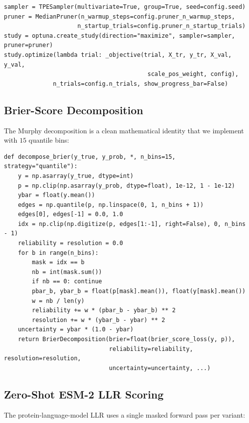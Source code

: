 \documentclass[11pt,a4paper,oneside]{report}
\begin{document}
\begin{lstlisting}[caption={Optuna TPE search definition.},label={lst:tpe}]
sampler = TPESampler(multivariate=True, group=True, seed=config.seed)
pruner = MedianPruner(n_warmup_steps=config.pruner_n_warmup_steps,
                     n_startup_trials=config.pruner_n_startup_trials)
study = optuna.create_study(direction="maximize", sampler=sampler, pruner=pruner)
study.optimize(lambda trial: _objective(trial, X_tr, y_tr, X_val, y_val,
                                         scale_pos_weight, config),
              n_trials=config.n_trials, show_progress_bar=False)
\end{lstlisting}

\subsection{Brier-Score Decomposition}
\label{sec:impl-brier}
The Murphy decomposition is a clean mathematical
identity that we implement with $15$ quantile bins:

\begin{lstlisting}[caption={Brier decomposition from \texttt{src/calibration\_deep.py}.},label={lst:brier}]
def decompose_brier(y_true, y_prob, *, n_bins=15, strategy="quantile"):
    y = np.asarray(y_true, dtype=int)
    p = np.clip(np.asarray(y_prob, dtype=float), 1e-12, 1 - 1e-12)
    ybar = float(y.mean())
    edges = np.quantile(p, np.linspace(0, 1, n_bins + 1))
    edges[0], edges[-1] = 0.0, 1.0
    idx = np.clip(np.digitize(p, edges[1:-1], right=False), 0, n_bins - 1)
    reliability = resolution = 0.0
    for b in range(n_bins):
        mask = idx == b
        nb = int(mask.sum())
        if nb == 0: continue
        pbar_b, ybar_b = float(p[mask].mean()), float(y[mask].mean())
        w = nb / len(y)
        reliability += w * (pbar_b - ybar_b) ** 2
        resolution += w * (ybar_b - ybar) ** 2
    uncertainty = ybar * (1.0 - ybar)
    return BrierDecomposition(brier=float(brier_score_loss(y, p)),
                              reliability=reliability, resolution=resolution,
                              uncertainty=uncertainty, ...)
\end{lstlisting}

\subsection{Zero-Shot ESM-2 LLR Scoring}
\label{sec:impl-esm2}
The protein-language-model LLR uses a single masked
forward pass per variant:
\end{document}
